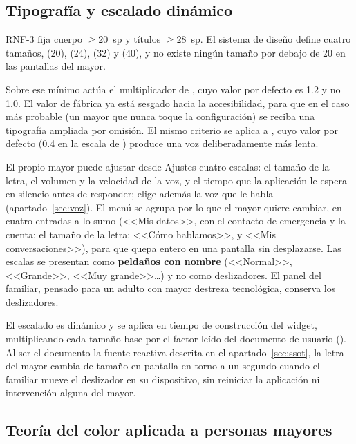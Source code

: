 \subsection{Tipografía y escalado dinámico}

RNF-3 fija cuerpo $\geq 20$~sp y títulos $\geq 28$~sp. El sistema de diseño define cuatro tamaños,  (20),  (24),  (32) y  (40), y no existe ningún tamaño por debajo de 20 en las pantallas del mayor.

Sobre ese mínimo actúa el multiplicador  de , cuyo valor por defecto es 1.2 y no 1.0. El valor de fábrica ya está sesgado hacia la accesibilidad, para que en el caso más probable (un mayor que nunca toque la configuración) se reciba una tipografía ampliada por omisión. El mismo criterio se aplica a , cuyo valor por defecto (0.4 en la escala de ) produce una voz deliberadamente más lenta.

El propio mayor puede ajustar desde Ajustes cuatro escalas: el tamaño de la letra, el volumen y la velocidad de la voz, y el tiempo que la aplicación le espera en silencio antes de responder; elige además la voz que le habla (apartado~\ref{sec:voz}). El menú se agrupa por lo que el mayor quiere cambiar, en cuatro entradas a lo sumo (<<Mis datos>>, con el contacto de emergencia y la cuenta; el tamaño de la letra; <<Cómo hablamos>>, y <<Mis conversaciones>>), para que quepa entero en una pantalla sin desplazarse. Las escalas se presentan como \textbf{peldaños con nombre} (<<Normal>>, <<Grande>>, <<Muy grande>>\ldots) y no como deslizadores. El panel del familiar, pensado para un adulto con mayor destreza tecnológica, conserva los deslizadores.

El escalado es dinámico y se aplica en tiempo de construcción del widget, multiplicando cada tamaño base por el factor leído del documento de usuario (). Al ser el documento la fuente reactiva descrita en el apartado~\ref{sec:ssot}, la letra del mayor cambia de tamaño en pantalla en torno a un segundo cuando el familiar mueve el deslizador en su dispositivo, sin reiniciar la aplicación ni intervención alguna del mayor.

\subsection{Teoría del color aplicada a personas mayores}
\label{sec:color}

